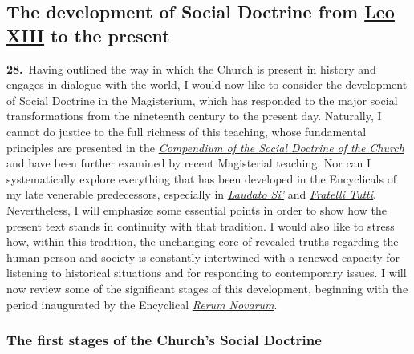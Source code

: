 \documentclass{article}
\begin{document}
\subsection[The development of Social Doctrine from Leo XIII to the present]{The development of Social Doctrine from \href{https://www.vatican.va/content/leo-xiii/en.html}{Leo XIII} to the present}

\textbf{28.}\ Having outlined the way in which the Church is present in history and engages in dialogue with the world, I would now like to consider the development of Social Doctrine in the Magisterium, which has responded to the major social transformations from the nineteenth century to the present day. Naturally, I cannot do justice to the full richness of this teaching, whose fundamental principles are presented in the \href{https://www.vatican.va/roman_curia/pontifical_councils/justpeace/documents/rc_pc_justpeace_doc_20060526_compendio-dott-soc_en.html}{\emph{Compendium of the Social Doctrine of the Church}} and have been further examined by recent Magisterial teaching. Nor can I systematically explore everything that has been developed in the Encyclicals of my late venerable predecessors, especially in \href{https://www.vatican.va/content/francesco/en/encyclicals/documents/papa-francesco_20150524_enciclica-laudato-si.html}{\emph{Laudato Si'}} and \href{https://www.vatican.va/content/francesco/en/encyclicals/documents/papa-francesco_20201003_enciclica-fratelli-tutti.html}{\emph{Fratelli Tutti}}. Nevertheless, I will emphasize some essential points in order to show how the present text stands in continuity with that tradition. I would also like to stress how, within this tradition, the unchanging core of revealed truths regarding the human person and society is constantly intertwined with a renewed capacity for listening to historical situations and for responding to contemporary issues. I will now review some of the significant stages of this development, beginning with the period inaugurated by the Encyclical \href{https://www.vatican.va/content/leo-xiii/en/encyclicals/documents/hf_l-xiii_enc_15051891_rerum-novarum.html}{\emph{Rerum Novarum}}.

\subsubsection{The first stages of the Church's Social Doctrine}
\end{document}
